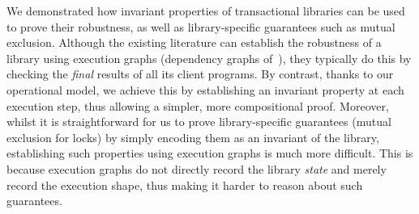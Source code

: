 We demonstrated how invariant properties of transactional libraries can be used to prove their robustness, as well as  library-specific guarantees such as mutual exclusion. 
Although the existing literature can establish the robustness of a library using execution graphs (\eg dependency graphs of~\cite{adya}), they typically do this by checking the \emph{final} results of all its client programs.
By contrast, thanks to our operational model, we achieve this by establishing an invariant property at each execution step, thus allowing a simpler, more compositional proof. 
Moreover, whilst it is straightforward for us to prove library-specific guarantees (\eg mutual exclusion for locks) by simply encoding them as an invariant of the library, 
establishing such properties using execution graphs is much more difficult. 
This is because execution graphs do not directly record the library \emph{state} and merely record the execution shape, thus making it harder to reason about such guarantees.
